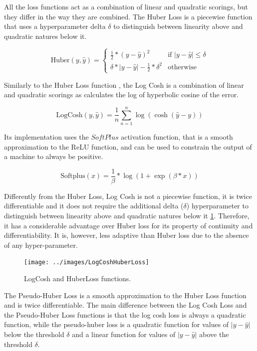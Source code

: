 All the loss functions act as a combination of linear and quadratic scorings, but they differ in the way they are combined.
The Huber Loss is a piecewise function that uses a hyperparameter delta $\delta$ to distinguish between linearity above and quadratic natures below it.

\begin{equation}
\label{eq:huber}
    \text{Huber}(y, \hat{y}) = \begin{cases}
    \frac{1}{2} \ast (y - \hat{y})^2 & \text{if } |y - \hat{y}| \leq \delta \\
    \delta \ast |y - \hat{y}| - \frac{1}{2} \ast \delta^2 & \text{otherwise}
    \end{cases}
\end{equation}

Similarly to the Huber Loss function \cite{huber1964robust}, the Log Cosh is a combination of linear and quadratic scorings as calculates the log of hyperbolic cosine of the error.

\begin{equation}
\label{eq:logcosh}
    \text{LogCosh}(y, \hat{y}) = \frac{1}{n} \sum_{n = 1}^{n} \log(\cosh(\hat{y} - y))
\end{equation}

Its implementation uses the $SoftPlus$ activation function, that is a smooth approximation to the ReLU function, and can be used to constrain the output of a machine to always be positive.

\begin{equation}
    \label{eq:softplus}
    \text{Softplus}(x) = \frac{1}{\beta} \ast \log(1 + \exp(\beta \ast x))
\end{equation}

Differently from the Huber Loss, Log Cosh is not a piecewise function, it is twice differentiable and it does not require the additional delta ($\delta$) hyperparameter to distinguish between linearity above and quadratic natures below it \ref{fig:LogCoshHuberLoss}.
Therefore, it has a considerable advantage over Huber loss for its property of continuity and differentiability.
It is, however, less adaptive than Huber loss due to the absence of any hyper-parameter.

\begin{figure}[t!]
    \texttt{[image: ../images/LogCoshHuberLoss]}
    \caption{LogCosh and HuberLoss functions.}
    \label{fig:LogCoshHuberLoss}
    \centering
\end{figure}

The Pseudo-Huber Loss is a smooth approximation to the Huber Loss function and is twice differentiable.
The main difference between the Log Cosh Loss and the Pseudo-Huber Loss functions is that the log cosh loss is always a quadratic function, while the pseudo-huber loss is a quadratic function for values of $|y - \hat{y}|$ below the threshold $\delta$ and a linear function for values of $|y - \hat{y}|$ above the threshold $\delta$.

